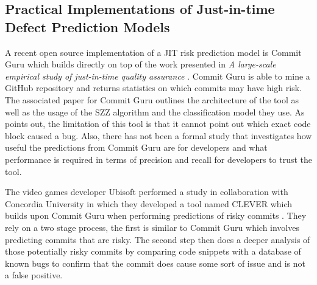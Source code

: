 \documentclass[../main.tex]{subfiles}
\begin{document}
\subsection{Practical Implementations of Just-in-time Defect Prediction Models}

A recent open source implementation of a JIT risk prediction model is Commit Guru which builds directly on top of the work presented in \textit{A large-scale empirical study of just-in-time quality assurance} \cite{rosen2015commit}. Commit Guru is able to mine a GitHub repository and returns statistics on which commits may have high risk. The associated paper for Commit Guru outlines the architecture of the tool as well as the usage of the SZZ algorithm and the classification model they use. As \cite{nayrolles2018clever} points out, the limitation of this tool is that it cannot point out which exact code block caused a bug. Also, there has not been a formal study that investigates how useful the predictions from Commit Guru are for developers and what performance is required in terms of precision and recall for developers to trust the tool. 

The video games developer Ubisoft performed a study in collaboration with Concordia University in which they developed a tool named CLEVER which builds upon Commit Guru when performing predictions of risky commits \cite{nayrolles2018clever}. They rely on a two stage process, the first is similar to Commit Guru which involves predicting commits that are risky. The second step then does a deeper analysis of those potentially risky commits by comparing code snippets with a database of known bugs to confirm that the commit does cause some sort of issue and is not a false positive. 
\end{document}
